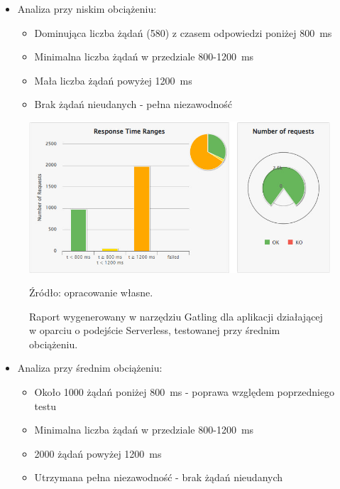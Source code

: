 \documentclass[runningheads,12pt]{llncs}
\begin{document}
\begin{itemize}
  \item Analiza przy niskim obciążeniu:
  \begin{itemize}
    \item Dominująca liczba żądań (580) z czasem odpowiedzi poniżej 800~ms
    \item Minimalna liczba żądań w przedziale 800-1200~ms
    \item Mała liczba żądań powyżej 1200~ms
    \item Brak żądań nieudanych - pełna niezawodność
  \end{itemize}
\end{itemize}

\newpage

\begin{figure}
    \includegraphics[width=\linewidth]{images/serverless-gatling-middle-graph.jpg}
    \caption{Raport wygenerowany w narzędziu Gatling dla aplikacji działającej w oparciu o podejście Serverless, testowanej przy średnim obciążeniu.} \label{fig2}
    \vspace{0.5em}
    {\small Źródło: opracowanie własne.}
\end{figure}

\begin{itemize}
  \item Analiza przy średnim obciążeniu:
  \begin{itemize}
    \item Około 1000 żądań poniżej 800~ms - poprawa względem poprzedniego testu
    \item Minimalna liczba żądań w przedziale 800-1200~ms
    \item 2000 żądań powyżej 1200~ms
    \item Utrzymana pełna niezawodność - brak żądań nieudanych
  \end{itemize}
\end{itemize}
\end{document}
